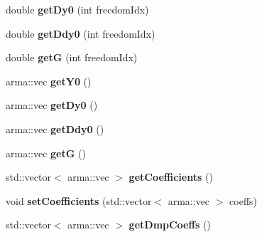 \begin{DoxyCompactItemize}
\item 
\hypertarget{classkukadu_1_1Dmp_a1a552adfe0f620b5c34e05ecf56fd55f}{double {\bfseries get\-Dy0} (int freedom\-Idx)}\label{classkukadu_1_1Dmp_a1a552adfe0f620b5c34e05ecf56fd55f}

\item 
\hypertarget{classkukadu_1_1Dmp_a7d16db0cc1e7aadb52e88b9ce88ed013}{double {\bfseries get\-Ddy0} (int freedom\-Idx)}\label{classkukadu_1_1Dmp_a7d16db0cc1e7aadb52e88b9ce88ed013}

\item 
\hypertarget{classkukadu_1_1Dmp_a1b7816ff8f66155afad0a50f9cf40ab0}{double {\bfseries get\-G} (int freedom\-Idx)}\label{classkukadu_1_1Dmp_a1b7816ff8f66155afad0a50f9cf40ab0}

\item 
\hypertarget{classkukadu_1_1Dmp_ae2c58371b5c9846a8d4e5a6145a5b4a8}{arma\-::vec {\bfseries get\-Y0} ()}\label{classkukadu_1_1Dmp_ae2c58371b5c9846a8d4e5a6145a5b4a8}

\item 
\hypertarget{classkukadu_1_1Dmp_a507c50bd598249260b23368ed5ea88c8}{arma\-::vec {\bfseries get\-Dy0} ()}\label{classkukadu_1_1Dmp_a507c50bd598249260b23368ed5ea88c8}

\item 
\hypertarget{classkukadu_1_1Dmp_a625b8794d3e59632412f76d447ccc430}{arma\-::vec {\bfseries get\-Ddy0} ()}\label{classkukadu_1_1Dmp_a625b8794d3e59632412f76d447ccc430}

\item 
\hypertarget{classkukadu_1_1Dmp_ac8c841b12e4eb2678424d96c6dbbb5bc}{arma\-::vec {\bfseries get\-G} ()}\label{classkukadu_1_1Dmp_ac8c841b12e4eb2678424d96c6dbbb5bc}

\item 
\hypertarget{classkukadu_1_1Dmp_a4b477fea8132d45d50617d9027f55634}{std\-::vector$<$ arma\-::vec $>$ {\bfseries get\-Coefficients} ()}\label{classkukadu_1_1Dmp_a4b477fea8132d45d50617d9027f55634}

\item 
\hypertarget{classkukadu_1_1Dmp_ace27ff809c779f83daf1fd903636a332}{void {\bfseries set\-Coefficients} (std\-::vector$<$ arma\-::vec $>$ coeffs)}\label{classkukadu_1_1Dmp_ace27ff809c779f83daf1fd903636a332}

\item 
\hypertarget{classkukadu_1_1Dmp_aec1043e1b9eda2418848eca83e3b7ae1}{std\-::vector$<$ arma\-::vec $>$ {\bfseries get\-Dmp\-Coeffs} ()}\label{classkukadu_1_1Dmp_aec1043e1b9eda2418848eca83e3b7ae1}


\end{DoxyCompactItemize}
